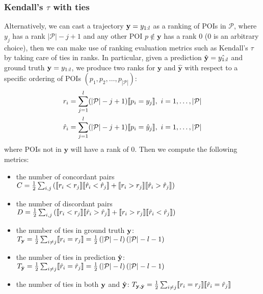\subsubsection{Kendall's $\tau$ with ties}
Alternatively, we can cast a trajectory $\mathbf{y} = y_{1:l}$ as a ranking of POIs in $\mathcal{P}$,
where $y_j$ has a rank $| \mathcal{P} | - j + 1$ and any other POI $p \notin \mathbf{y}$ has a rank $0$ ($0$ is an arbitrary choice),
then we can make use of ranking evaluation metrics such as Kendall's $\tau$ by taking care of ties in ranks.
In particular, given a prediction $\hat{\mathbf{y}} = \hat{y_{1:l}}$ and ground truth $\mathbf{y} = y_{1:l}$,
we produce two ranks for $\mathbf{y}$ and $\hat{\mathbf{y}}$ with respect to 
a specific ordering of POIs $(p_1, p_2, \dots, p_{|\mathcal{P}|})$:
\begin{align*}
r_i       &= \sum_{j=1}^l (| \mathcal{P} | - j + 1)  \llbracket p_i = y_j \rrbracket,~
i = 1, \dots, | \mathcal{P} | \\
\hat{r}_i &= \sum_{j=1}^l (| \mathcal{P} | - j + 1)  \llbracket p_i = \hat{y}_j \rrbracket,~
i = 1, \dots, | \mathcal{P} |
\end{align*}
where POIs not in $\mathbf{y}$ will have a rank of $0$.
Then we compute the following metrics:
\begin{itemize}
\item the number of concordant pairs \(
      C = \frac{1}{2} \sum_{i,j} \left(\llbracket r_i < r_j \rrbracket  \llbracket \hat{r}_i < \hat{r}_j \rrbracket +
                      \llbracket r_i > r_j \rrbracket  \llbracket \hat{r}_i > \hat{r}_j \rrbracket \right) \)
\item the number of discordant pairs \(
      D = \frac{1}{2} \sum_{i,j} \left(\llbracket r_i < r_j \rrbracket  \llbracket \hat{r}_i > \hat{r}_j \rrbracket +
                      \llbracket r_i > r_j \rrbracket  \llbracket \hat{r}_i < \hat{r}_j \rrbracket \right) \)
\item the number of ties in ground truth $\mathbf{y}$: \(
      T_{\mathbf{y}} = \frac{1}{2} \sum_{i \ne j} \llbracket r_i = r_j \rrbracket 
                     = \frac{1}{2} \left( |\mathcal{P}| - l \right) \left( |\mathcal{P}| - l - 1 \right) \)
\item the number of ties in prediction $\hat{\mathbf{y}}$: \(
      T_{\hat{\mathbf{y}}} = \frac{1}{2} \sum_{i \ne j} \llbracket \hat{r}_i = \hat{r}_j \rrbracket 
                           = \frac{1}{2} \left( |\mathcal{P}| - l \right) \left( |\mathcal{P}| - l - 1 \right) \)
\item the number of ties in both $\mathbf{y}$ and $\hat{\mathbf{y}}$: \(
      T_{\mathbf{y},\hat{\mathbf{y}}} = \frac{1}{2} \sum_{i \ne j} \llbracket r_i = r_j \rrbracket  \llbracket \hat{r}_i = \hat{r}_j \rrbracket \)
\end{itemize}
